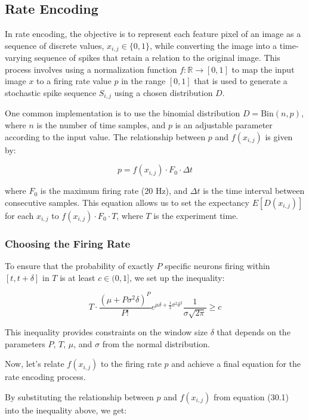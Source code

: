 \subsection{Rate Encoding}

In rate encoding, the objective is to represent each feature pixel of an image as a sequence of discrete values, \(x_{i,j} \in \{0, 1\}\), while converting the image into a time-varying sequence of spikes that retain a relation to the original image. This process involves using a normalization function \(f: \mathbb{R} \rightarrow [0, 1]\) to map the input image \(x\) to a firing rate value \(p\) in the range \([0, 1]\) that is used to generate a stochastic spike sequence \(S_{i,j}\) using a chosen distribution \(D\).

One common implementation is to use the binomial distribution \(D = \text{Bin}(n, p)\), where \(n\) is the number of time samples, and \(p\) is an adjustable parameter according to the input value. The relationship between \(p\) and \(f(x_{i,j})\) is given by:

\begin{equation}
    p = f(x_{i,j}) \cdot F_0 \cdot \Delta t 
\end{equation}

where \(F_0\) is the maximum firing rate (20 Hz), and \(\Delta t\) is the time interval between consecutive samples. This equation allows us to set the expectancy \(E[D(x_{i,j})]\) for each \(x_{i,j}\) to \(f(x_{i,j}) \cdot F_0 \cdot T\), where \(T\) is the experiment time.

\subsubsection{Choosing the Firing Rate}

To ensure that the probability of exactly \(P\) specific neurons firing within \([t, t + \delta]\) in \(T\) is at least \(c \in (0, 1]\), we set up the inequality:

\[
T \cdot \frac{(\mu + P\sigma^2\delta)^P}{P!} e^{\mu\delta + \frac{1}{2}\sigma^2 \delta^2} \frac{1}{\sigma \sqrt{2\pi}} \geq c
\]

This inequality provides constraints on the window size \(\delta\) that depends on the parameters \(P\), \(T\), \(\mu\), and \(\sigma\) from the normal distribution. 

Now, let's relate \(f(x_{i,j})\) to the firing rate \(p\) and achieve a final equation for the rate encoding process.

By substituting the relationship between \(p\) and \(f(x_{i,j})\) from equation (30.1) into the inequality above, we get:

